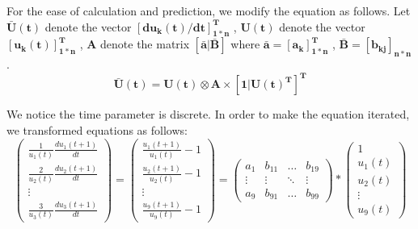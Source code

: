 \documentclass[11pt]{article}
\begin{document}
For the ease of calculation and prediction, we modify the equation as follows. Let $\bm{\bar U(t)}$ denote the vector $\bm{[du_{k}(t)/dt]^{T}_{1*n}}$  , $\bm{U(t)}$ denote the vector $\bm{[u_{k}(t)]^{T}_{1*n}}$  , $\bm{A}$ denote the matrix $\bm{[\bar a | {\bar B}]}$ where $\bm{{\bar a}=[a_{k}]^T_{1*n}}$  , $\bm{{\bar B}=[b_{kj}]_{n*n}}$.
\begin{equation}
	\bm {{\bar U(t)}=U(t)\otimes A \times [1 | U(t)^{T}]^{T}}
\end{equation}

We notice the time parameter is discrete. In order to make the equation iterated, we transformed equations as follows:
\begin{equation}
	\begin{pmatrix}
		\frac{1}{u_{1}(t)}\frac{du_{1}(t+1)}{dt} \\
		\frac{2}{u_{2}(t)}\frac{du_{2}(t+1)}{dt} \\
		\vdots \\
		\frac{3}{u_{3}(t)}\frac{du_{3}(t+1)}{dt}	
	\end{pmatrix}
	=
	\begin{pmatrix}
		\frac{u_{1}(t+1)}{u_{1}(t)} - 1 \\
		\frac{u_{2}(t+1)}{u_{2}(t)} - 1 \\
		\vdots \\
		\frac{u_{9}(t+1)}{u_{9}(t)} - 1
	\end{pmatrix}
	=
	\begin{pmatrix}
		a_{1} & b_{11} & \ldots & b_{19} \\
		\vdots & \vdots & \ddots & \vdots \\
		a_{9} & b_{91} & \ldots & b_{99}
	\end{pmatrix}
	\ast
	\begin{pmatrix}
		1 \\
		u_{1}(t) \\
		u_{2}(t) \\
		\vdots \\
		u_{9}(t)
	\end{pmatrix}
\end{equation}
\end{document}
